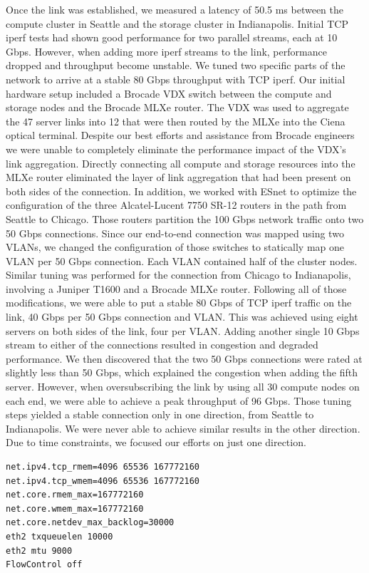\documentclass[]{sigplan-proc}
\begin{document}
Once the link was established, we measured a latency of 50.5 ms between the compute cluster in Seattle and the
storage cluster in Indianapolis. Initial TCP iperf tests had shown good performance for two
parallel streams, each at 10 Gbps. However, when adding more iperf streams to the link, performance dropped
and throughput become unstable. We tuned two specific parts of the network to arrive at a stable 80 Gbps
throughput with TCP iperf. Our initial hardware setup included a Brocade VDX switch between the compute and
storage nodes and the Brocade MLXe router. The VDX was used to aggregate the 47 server links into 12 that were then
routed by the MLXe into the Ciena optical terminal. Despite our best efforts and assistance from Brocade
engineers we were unable to completely eliminate the performance impact of the VDX's link
aggregation. Directly connecting all compute and storage resources into the MLXe router eliminated the layer
of link aggregation that had been present on both sides of the connection. In addition, we worked with ESnet
to optimize the configuration of the three Alcatel-Lucent 7750 SR-12 routers in the path from Seattle to
Chicago. Those routers partition the 100 Gbps network traffic onto two 50 Gbps connections. Since our
end-to-end connection was mapped using two VLANs, we changed the configuration of those switches to statically
map one VLAN per 50 Gbps connection. Each VLAN contained half of the cluster nodes. Similar tuning was
performed for the connection from Chicago to Indianapolis, involving a Juniper T1600 and a Brocade MLXe
router. Following all of those modifications, we were able to put a stable 80 Gbps of TCP iperf traffic on the link, 40
Gbps per 50 Gbps connection and VLAN. This was achieved using eight servers on both sides of the link, four
per VLAN. Adding another single 10 Gbps stream to either of the connections resulted in congestion and
degraded performance. We then discovered that the two 50 Gbps connections were rated at slightly
less than 50 Gbps, which explained the congestion when adding the fifth server. However, when oversubscribing
the link by using all 30 compute nodes on each end, we were able to achieve a peak throughput of 96
Gbps. Those tuning steps yielded a stable connection only in one direction, from Seattle to Indianapolis. We
were never able to achieve similar results in the other direction. Due to time constraints, we focused our
efforts on just one direction.

\lstset{language=Bash, caption=Tuning parameters for the network, label=TuningListing}
\begin{lstlisting}
net.ipv4.tcp_rmem=4096 65536 167772160
net.ipv4.tcp_wmem=4096 65536 167772160
net.core.rmem_max=167772160
net.core.wmem_max=167772160
net.core.netdev_max_backlog=30000
eth2 txqueuelen 10000
eth2 mtu 9000
FlowControl off 
\end{lstlisting}
\end{document}
